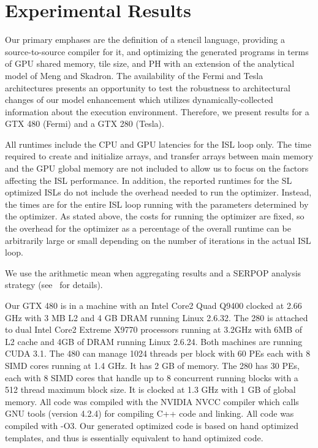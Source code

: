 \documentclass{sig-alternate}
\begin{document}
\section{Experimental Results}\label{sec:results}

Our primary emphases are the definition of a stencil language, providing a
source-to-source compiler for it, and optimizing the generated programs in
terms of GPU shared memory, tile size, and PH with an extension of the
analytical model of Meng and Skadron.  The availability of the Fermi and
Tesla architectures presents an opportunity to test the robustness to
architectural changes of our model enhancement which utilizes
dynamically-collected information about the execution environment.
Therefore, we present results for a GTX 480 (Fermi) and a GTX 280 (Tesla).

All runtimes include the CPU and GPU latencies for the ISL loop only.  The
time required to create and initialize arrays, and transfer arrays between
main memory and the GPU global memory are not included to allow us to focus
on the factors affecting the ISL performance.  In addition, the reported
runtimes for the SL optimized ISLs do not include the overhead needed to run
the optimizer.  Instead, the times are for the entire ISL loop running with
the parameters determined by the optimizer.  As stated above, the costs for
running the optimizer are fixed, so the overhead for the optimizer as a
percentage of the overall runtime can be arbitrarily large or small depending
on the number of iterations in the actual ISL loop.

We use the arithmetic mean when aggregating results and a SERPOP analysis
strategy (see~\cite{Mashey} for details).

Our GTX 480 is in a machine with an Intel Core2 Quad Q9400 clocked at 2.66
GHz with 3 MB L2 and 4 GB DRAM running Linux 2.6.32.  The 280 is attached to
dual Intel Core2 Extreme X9770 processors running at 3.2GHz with 6MB of L2
cache and 4GB of DRAM running Linux 2.6.24.  Both machines are running CUDA
3.1.  The 480 can manage 1024 threads per block with 60 PEs each with 8 SIMD
cores running at 1.4 GHz.  It has 2 GB of memory.  The 280 has 30 PEs, each
with 8 SIMD cores that handle up to 8 concurrent running blocks with a 512
thread maximum block size.  It is clocked at 1.3 GHz with 1 GB of global
memory.  All code was compiled with the NVIDIA NVCC compiler which calls GNU
tools (version 4.2.4) for compiling C++ code and linking.  All code was
compiled with -O3.  Our generated optimized code is based on hand optimized
templates, and thus is essentially equivalent to hand optimized code.
\end{document}
